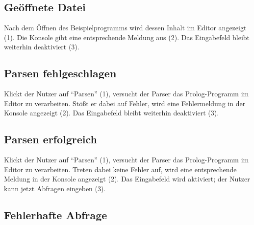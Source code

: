 \documentclass[parskip=full,11pt,twoside]{scrartcl}
\begin{document}
\subsection{Geöffnete Datei}

\begin{minipage}{\linewidth}
\end{minipage}

Nach dem Öffnen des Beispielprogramms wird dessen Inhalt im Editor angezeigt (1).
Die Konsole gibt eine entsprechende Meldung aus (2).
Das Eingabefeld bleibt weiterhin deaktiviert (3).

\subsection{Parsen fehlgeschlagen}

\begin{minipage}{\linewidth}
\end{minipage}

Klickt der Nutzer auf \enquote{Parsen} (1), versucht der Parser das Prolog-Programm im Editor zu verarbeiten.
Stößt er dabei auf Fehler, wird eine Fehlermeldung in der Konsole angezeigt (2).
Das Eingabefeld bleibt weiterhin deaktiviert (3).

\subsection{Parsen erfolgreich}

\begin{minipage}{\linewidth}
\end{minipage}

Klickt der Nutzer auf \enquote{Parsen} (1), versucht der Parser das Prolog-Programm im Editor zu verarbeiten.
Treten dabei keine Fehler auf, wird eine entsprechende Meldung in der Konsole angezeigt (2).
Das Eingabefeld wird aktiviert; der Nutzer kann jetzt Abfragen eingeben (3).

\subsection{Fehlerhafte Abfrage}
\end{document}
